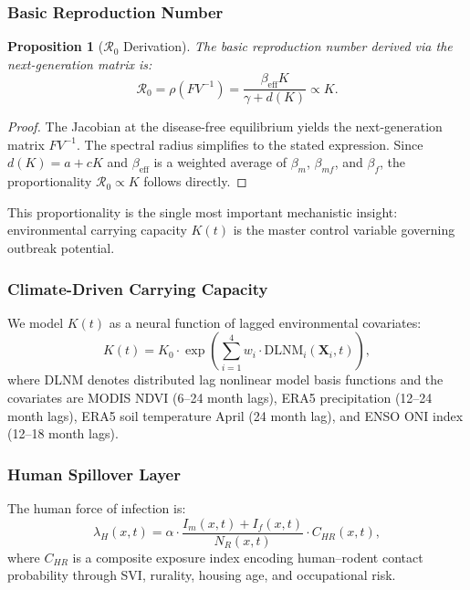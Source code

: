 \documentclass[11pt,a4paper]{article}
\newtheorem{proposition}{Proposition}
\newcommand{\Rzero}{\mathcal{R}_0}
\begin{document}
\subsubsection{Basic Reproduction Number}

\begin{proposition}[$\Rzero$ Derivation]
The basic reproduction number derived via the next-generation matrix is:
\begin{equation}
\Rzero = \rho(FV^{-1}) = \frac{\beta_{\text{eff}} K}{\gamma + d(K)} \propto K.
\end{equation}
\end{proposition}

\begin{proof}
The Jacobian at the disease-free equilibrium yields the next-generation matrix $FV^{-1}$. The spectral radius simplifies to the stated expression. Since $d(K) = a + cK$ and $\beta_{\text{eff}}$ is a weighted average of $\beta_m$, $\beta_{mf}$, and $\beta_f$, the proportionality $\Rzero \propto K$ follows directly.
\end{proof}

This proportionality is the single most important mechanistic insight: environmental carrying capacity $K(t)$ is the master control variable governing outbreak potential.

\subsubsection{Climate-Driven Carrying Capacity}

We model $K(t)$ as a neural function of lagged environmental covariates:
\begin{equation}
K(t) = K_0 \cdot \exp\left( \sum_{i=1}^{4} w_i \cdot \text{DLNM}_i(\mathbf{X}_i, t) \right),
\end{equation}
where DLNM denotes distributed lag nonlinear model basis functions and the covariates are MODIS NDVI (6--24 month lags), ERA5 precipitation (12--24 month lags), ERA5 soil temperature April (24 month lag), and ENSO ONI index (12--18 month lags).

\subsubsection{Human Spillover Layer}

The human force of infection is:
\begin{equation}
\lambda_H(x,t) = \alpha \cdot \frac{I_m(x,t) + I_f(x,t)}{N_R(x,t)} \cdot C_{HR}(x,t),
\end{equation}
where $C_{HR}$ is a composite exposure index encoding human--rodent contact probability through SVI, rurality, housing age, and occupational risk.
\end{document}
